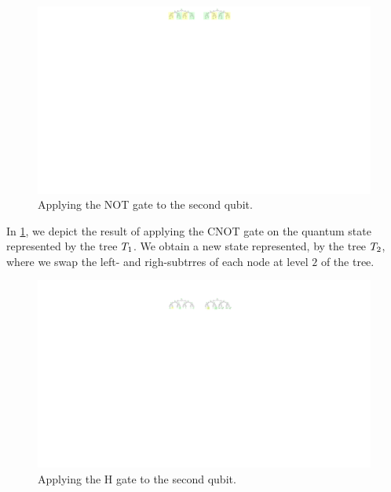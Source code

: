 \begin{figure}
\center
\includegraphics[]{Figures/Trees/ApplyNOT}
\caption{Applying the NOT gate to the second qubit.}
\label{apply:not:fig}
\end{figure}
%
In \ref{apply:not:fig}, we depict the result of applying the CNOT gate on the quantum state represented by the tree $T_{1}$.
%
We obtain a new state represented, by the tree $T_{2}$, where we swap the left- and righ-subtrres of each node at level $2$ of the tree.

\begin{figure}
\center
\includegraphics[]{Figures/Trees/ApplyH}
\caption{Applying the H gate to the second qubit.}
\label{apply:H:fig}
\end{figure}

